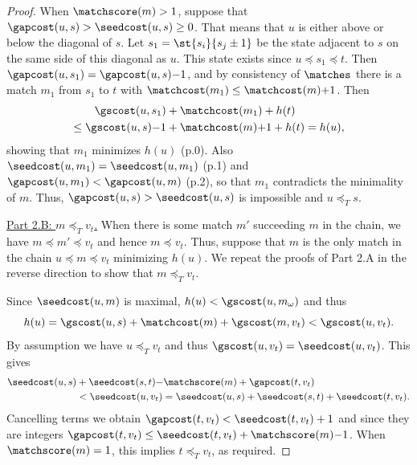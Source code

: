 \begin{proof}
  When $\matchscore(m) > 1$, suppose that $\gapcost(u, s) > \seedcost(u,s)\geq
  0$. That means that $u$ is either above or below the diagonal of $s$. Let ${s_1
  = \st{s_i}{s_j \pm 1}}$ be the state adjacent to $s$ on the same side of this
  diagonal as $u$. This state exists since $u\preceq s_1 \preceq t$.
  Then $\gapcost(u, s_1) = \gapcost(u, s) {-} 1$, and by
  consistency of $\matches$ there is a match $m_1$ from $s_1$ to $t$ with
  $\matchcost(m_1) \leq \matchcost(m){+}1$. Then
  \begin{align*}
    \gscost(u, s_1) &+ \matchcost(m_1) +h(t)\\
    \leq \gscost(u, s){-}1 &+ \matchcost(m){+}1 +h(t) = h(u),
  \end{align*}
  showing that $m_1$ minimizes $h(u)$ (p.0). Also $\seedcost(u, m_1) =
  \seedcost(u, m_1)$ (p.1) and $\gapcost(u, m_1) < \gapcost(u, m)$ (p.2), so
  that $m_1$ contradicts the minimality of $m$. Thus, $\gapcost(u, s) >
  \seedcost(u,s)$ is impossible and $u\preceq_T s$.

  \underline{Part 2.B: $m\preceq_T v_t$.}
  When there is some match $m'$ succeeding $m$ in the chain, we have $m\preceq
  m'\preceq v_t$ and hence $m\preceq v_t$.  Thus, suppose that $m$ is the only
  match in the chain $u\preceq m\preceq v_t$ minimizing $h(u)$. We repeat the
  proofs of Part 2.A in the reverse direction to show that $m\preceq_T v_t$.

  Since $\seedcost(u, m)$ is maximal, $h(u) < \gscost(u, m_\omega)$ and thus
  \begin{equation*}
  h(u) = \gscost(u, s) + \matchcost(m) + \gscost(m, v_t) < \gscost(u, v_t).
  \end{equation*}
  By assumption we have $u\preceq_T v_t$ and thus $\gscost(u, v_t) =
  \seedcost(u, v_t)$. This gives
  \begin{align*}
    \seedcost(u, s) &+ \seedcost(s, t){-}\matchscore(m) + \gapcost(t, v_t) \\
    &< \seedcost(u, v_t)
    = \seedcost(u, s) + \seedcost(s, t) + \seedcost(t, v_t).
  \end{align*}
  Cancelling terms we obtain $\gapcost(t, v_t) < \seedcost(t, v_t)+1$ and since
  they are integers $\gapcost(t, v_t) \leq \seedcost(t, v_t) +
  \matchscore(m){-}1$. When $\matchscore(m) = 1$, this implies
  $t\preceq_T v_t$, as required.


\end{proof}
